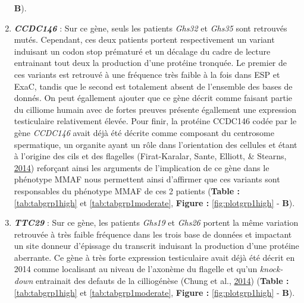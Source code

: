 \documentclass[12pt,twoside]{reedthesis}
\theoremstyle{definition}
\theoremstyle{definition}
\theoremstyle{remark}
\begin{document}
\begin{enumerate}
    \textbf{B}).
  \item
    \textbf{\emph{CCDC146}} : Sur ce gène, seuls les patients \emph{Ghs32}
    et \emph{Ghs35} sont retrouvés mutés. Cependant, ces deux patients
    portent respectivement un variant induisant un codon stop prématuré et
    un décalage du cadre de lecture entrainant tout deux la production
    d'une protéine tronquée. Le premier de ces variants est retrouvé à une
    fréquence très faible à la fois dans ESP et ExaC, tandis que le second
    est totalement absent de l'ensemble des bases de donnés. On peut
    égallement ajouter que ce gène décrit comme faisant partie du cilliome
    humain avec de fortes preuves présente égallement une expression
    testiculaire relativement élevée. Pour finir, la protéine CCDC146
    codée par le gène \emph{CCDC146} avait déjà été décrite comme
    composant du centrosome spermatique, un organite ayant un rôle dans
    l'orientation des cellules et étant à l'origine des cils et des
    flagelles (Firat-Karalar, Sante, Elliott, \& Stearns,
    \protect\hyperlink{ref-Firat-Karalar2014}{2014}) reforçant ainsi les
    arguments de l'implication de ce gène dans le phénotype MMAF nous
    permettent ainsi d'affirmer que ces variants sont responsables du
    phénotype MMAF de ces 2 patients (\textbf{Table :
    }\ref{tab:tabgrp1high} et \ref{tab:tabgrp1moderate}, \textbf{Figure :
    }\ref{fig:plotgrp1high} - \textbf{B}).
  \item
    \textbf{\emph{TTC29}} : Sur ce gène, les patients \emph{Ghs19} et
    \emph{Ghs26} portent la même variation retrouvée à très faible
    fréquence dans les trois base de données et impactant un site donneur
    d'épissage du transcrit induisant la production d'une protéine
    aberrante. Ce gène à très forte expression testiculaire avait déjà été
    décrit en 2014 comme localisant au niveau de l'axonème du flagelle et
    qu'un \emph{knock-down} entrainait des defauts de la cilliogénèse
    (Chung et al., \protect\hyperlink{ref-Chung2014}{2014}) (\textbf{Table
    : }\ref{tab:tabgrp1high} et \ref{tab:tabgrp1moderate}, \textbf{Figure
    : }\ref{fig:plotgrp1high} - \textbf{B}).
  \end{enumerate}
  
\end{document}

